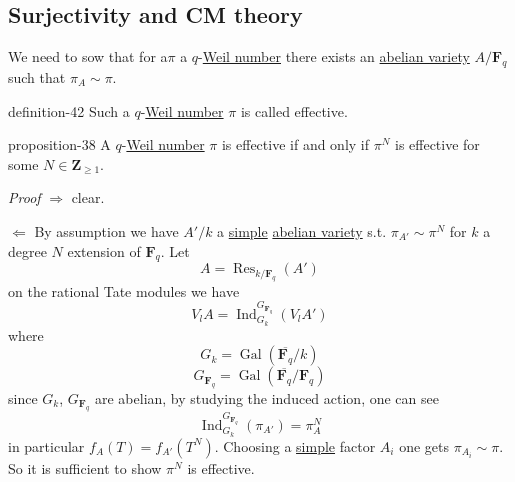 \documentclass[10pt,]{book}
\makeatletter
\renewcommand*{\proofname}{Proof}
\renewenvironment{proof}[1][\proofname]{\par
  \pushQED{\qed}%
  \normalfont \topsep6\p@\@plus6\p@\relax
  \trivlist
  \item\relax
    {\itshape
    #1\@addpunct{.}}\hspace\labelsep\ignorespaces
}{%
  \popQED\endtrivlist\@endpefalse
}
\numberwithin{equation}{section}
\newcommand{\ZZ}{\mathbf{Z}}
\newcommand{\FF}{\mathbf{F}}
\newcommand{\Gal}[2]{\operatorname{Gal}(#1/#2)}
\DeclareMathOperator{\Ind}{Ind}
\DeclareMathOperator{\Res}{Res}
\makeatother
\begin{document}
\subsection[{Surjectivity and CM theory}]{Surjectivity and CM theory}\label{subsection-37}
\hypertarget{p-431}{}%
We need to sow that for a\(\pi\) a \(q\)-\hyperref[sec-honda-tate]{Weil number} there exists an \hyperref[def-buntes-abvar]{abelian variety} \(A/\FF_q\) such that \(\pi_A \sim \pi\).%
\begin{definition}{}{definition-42}%
\hypertarget{p-432}{}%
Such a \(q\)-\hyperref[sec-honda-tate]{Weil number} \(\pi\) is called effective.%
\end{definition}
\begin{proposition}{}{}{proposition-38}%
\hypertarget{p-433}{}%
A \(q\)-\hyperref[sec-honda-tate]{Weil number} \(\pi\) is effective if and only if \(\pi^N\) is effective for some \(N\in \ZZ_{\ge 1}\).%
\end{proposition}
\begin{proof}\hypertarget{proof-74}{}
\hypertarget{p-434}{}%
\(\Rightarrow\) clear.%
\par
\hypertarget{p-435}{}%
\(\Leftarrow\) By assumption we have \(A'/k\) a \hyperref[def-simple-av]{simple} \hyperref[def-buntes-abvar]{abelian variety} s.t. \(\pi_{A'} \sim  \pi^N\) for \(k\) a degree \(N\) extension of \(\FF_q\). Let%
\begin{equation*}
A = \Res_{k/\FF_q}(A')
\end{equation*}
on the rational Tate modules we have%
\begin{equation*}
V_l A = \Ind_{G_k}^{G_{\FF_q}} (V_lA')
\end{equation*}
where%
\begin{equation*}
G_k = \Gal{\overline{\FF_q}}{k}
\end{equation*}
%
\begin{equation*}
G_{\FF_q} = \Gal{\overline{\FF_q}}{\FF_q}
\end{equation*}
since \(G_k\), \(G_{\FF_q}\) are abelian, by studying the induced action, one can see%
\begin{equation*}
\Ind_{G_k}^{G_{\FF_q}} (\pi_{A'}) = \pi_A^N
\end{equation*}
in particular \(f_A(T) = f_{A'}(T^N)\). Choosing a \hyperref[def-simple-av]{simple} factor \(A_i\) one gets \(\pi_{A_i} \sim \pi\).%
\end{proof}
\hypertarget{p-436}{}%
So it is sufficient to show \(\pi^N\) is effective.%
\par
\hypertarget{p-437}{}%
\end{document}
